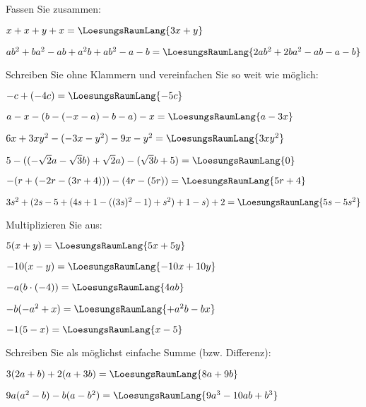 
\renewcommand{\bbwAufgabenBlockID}{A1G}

\renewcommand{\metaHeaderLine}{Aufgabenblatt}
\renewcommand{\arbeitsblattTitel}{Grundoperationen}



\arbeitsblattHeader{}
Fassen Sie zusammen:
\begin{bbwAufgabenBlock}
\item $x+x+y+x = \LoesungsRaumLang{3x+y}$
\item $ab^2+ba^2 -ab + a^2b + ab^2 - a -b  = \LoesungsRaumLang{2ab^2 + 2ba^2 - ab - a - b}$
\end{bbwAufgabenBlock}

Schreiben Sie ohne Klammern und vereinfachen Sie so weit wie möglich:
\begin{bbwAufgabenBlock}
\item $-c+(-4c) = \LoesungsRaumLang{-5c}$
\item $a-x-(b-(-x-a)-b-a)-x = \LoesungsRaumLang{a-3x}$
\item $6x+3xy^2 -(-3x-y^2)-9x-y^2 = \LoesungsRaumLang{3xy^2}$
\item $5-((-\sqrt{2}a - \sqrt{3}b)+\sqrt{2}a)-(\sqrt{3}b+5)= \LoesungsRaumLang{0}$
\item $-(r+(-2r-(3r+4)))-(4r-(5r))=\LoesungsRaumLang{5r+4}$
\item $3s^2+(2s-5+(4s+1-((3s)^2-1)+s^2)+1-s)+2 = \LoesungsRaumLang{5s-5s^2}$
\end{bbwAufgabenBlock}
\newpage

Multiplizieren Sie aus:

\begin{bbwAufgabenBlock}
\item $5(x+y)=\LoesungsRaumLang{5x+5y}$
\item $-10(x-y)=\LoesungsRaumLang{-10x+10y}$
\item $-a(b\cdot{}(-4)) = \LoesungsRaumLang{4ab}$
\item $-b(-a^2+x) = \LoesungsRaumLang{+a^2b - bx}$
\item $-1(5-x)=\LoesungsRaumLang{x-5}$
\end{bbwAufgabenBlock}


Schreiben Sie als möglichst einfache Summe (bzw. Differenz):
\begin{bbwAufgabenBlock}
\item $3(2a+b) + 2(a+3b)=\LoesungsRaumLang{8a+9b}$
\item $9a(a^2-b)-b(a-b^2) = \LoesungsRaumLang{9a^3 - 10ab + b^3}$
\end{bbwAufgabenBlock}

